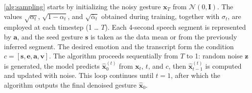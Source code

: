 \autoref{alg:sampling} starts by initializing the noisy gesture $\mathbf{x}_T$ from $\mathcal{N}(0, \mathbf{I})$.  
The values $\sqrt{\alpha_t}$, $\sqrt{1-\alpha_t}$, and $\sqrt{\bar{\alpha}_t}$ obtained during training, together with $\sigma_t$, are employed at each timestep (1 … $T$).  
Each 4-second speech segment is represented by $\mathbf{a}$, and the seed gesture $\mathbf{s}$ is taken as the data mean or from the previously inferred segment.  
The desired emotion and the transcript form the condition $c = [\mathbf{s}, \mathbf{e}, \mathbf{a}, \mathbf{v}]$.  
The algorithm proceeds sequentially from $T$ to 1: random noise $\mathbf{z}$ is generated, the model predicts $\hat{\mathbf{x}}_0^{(t)}$ from $\mathbf{x}_t$, $t$, and $c$, then $\hat{\mathbf{x}}_{t-1}^{(t)}$ is computed and updated with noise.  
This loop continues until $t=1$, after which the algorithm outputs the final denoised gesture $\hat{\mathbf{x}}_0$.
